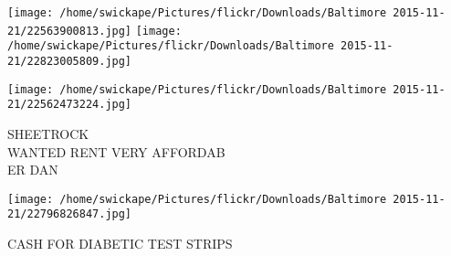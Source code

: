 \documentclass[10pt,letterpaper]{article}
\begin{document}
\texttt{[image: /home/swickape/Pictures/flickr/Downloads/Baltimore 2015-11-21/22563900813.jpg]}
\texttt{[image: /home/swickape/Pictures/flickr/Downloads/Baltimore 2015-11-21/22823005809.jpg]}

\texttt{[image: /home/swickape/Pictures/flickr/Downloads/Baltimore 2015-11-21/22562473224.jpg]}

SHEETROCK\\
WANTED RENT VERY AFFORDAB\\
ER DAN
\pagebreak

\texttt{[image: /home/swickape/Pictures/flickr/Downloads/Baltimore 2015-11-21/22796826847.jpg]}

CASH FOR DIABETIC TEST STRIPS
\pagebreak
\end{document}
